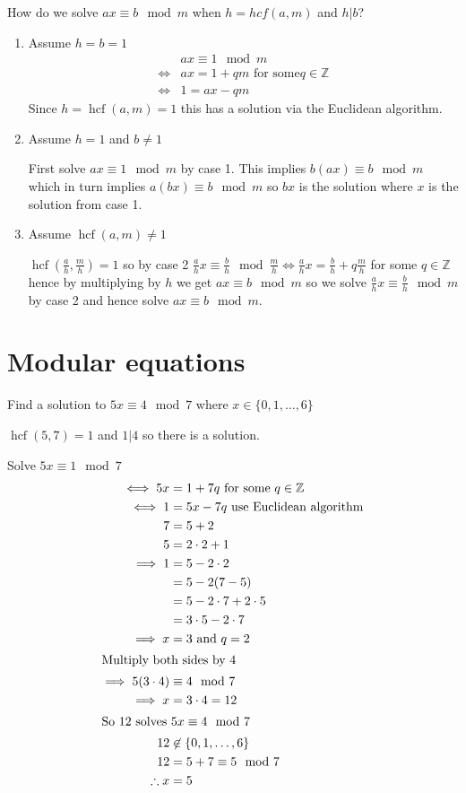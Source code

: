 \documentclass{article}
\newcommand{\bb}[1]{\mathbb{#1}}
\newcommand{\hcf}{\operatorname{hcf}}
\begin{document}
How do we solve \(ax\equiv b\mod m\) when \(h=hcf(a,m)\) and \(h|b\)?
\begin{enumerate}
\item Assume \(h=b=1\)
\begin{align*}
&ax\equiv1\mod m\\
\iff &ax=1+qm\text{ for some\(q\in\bb Z\)}\\
\iff &1=ax-qm
\end{align*}
Since \(h=\hcf(a,m)=1\) this has a solution via the Euclidean algorithm.
\item Assume \(h=1\) and \(b\ne1\)

First solve \(ax\equiv1\mod m\) by case 1. This implies \(b(ax)\equiv b\mod m\) which in turn implies \(a(bx)\equiv b\mod m\) so \(bx\) is the solution where \(x\) is the solution from case 1.
\item Assume \(\hcf(a,m)\ne 1\)

\(\hcf\left(\frac ah,\frac mh\right)=1\) so by case 2 \(\frac ah x\equiv\frac bh\mod\frac mh \iff \frac ah x=\frac bh+ q\frac mh\) for some \(q\in\bb Z\) hence by multiplying by \(h\) we get \(ax\equiv b\mod m\) so we solve \(\frac ah x\equiv \frac bh\mod m\) by case 2 and hence solve \(ax\equiv b\mod m\).
\end{enumerate}

\section{Modular equations}

Find a solution to \(5x\equiv 4\mod 7\) where \(x\in\{0,1,\dotsc,6\}\)

\(\hcf(5,7)=1\) and \(1|4\) so there is a solution.

Solve \(5x\equiv1\mod7\)
\begin{align*}
\iff 5x&=1+7q\text{ for some }q\in\bb Z\\
\iff 1&=5x-7q\text{ use Euclidean algorithm}\\
7&=5+2\\
5&=2\cdot2+1\\
\implies 1&=5-2\cdot2\\
&=5-2(7-5)\\
&=5-2\cdot7+2\cdot5\\
&=3\cdot5-2\cdot7\\
\implies x&=3\text{ and }q=2\\
\intertext{Multiply both sides by 4}
\implies 5(3\cdot4)&\equiv4\mod7\\
\implies x&=3\cdot4=12\\
\intertext{So 12 solves \(5x\equiv4\mod7\)}
12&\not\in\{0,1,\dotsc,6\}\\
12&=5+7\equiv5\mod7\\
\therefore x&=5
\end{align*}
\end{document}
